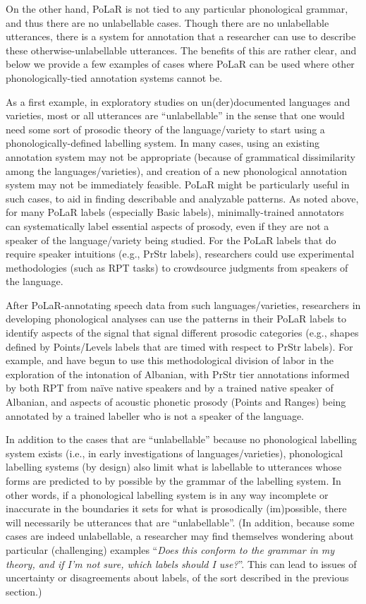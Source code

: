 \documentclass[11pt, twoside]{memoir}
\begin{document}
On the other hand, PoLaR is not tied to any particular phonological grammar, and thus there are no unlabellable cases. Though there are no unlabellable utterances, there is a system for annotation that a researcher can use to describe these otherwise-unlabellable utterances. The benefits of this are rather clear, and below we provide a few examples of cases where PoLaR can be used where other phonologically-tied annotation systems cannot be.

As a first example, in exploratory studies on un(der)documented languages and varieties, most or all utterances are “unlabellable” in the sense that one would need some sort of prosodic theory of the language\slash variety to start using a phonologically-defined labelling system. In many cases, using an existing annotation system may not be appropriate (because of grammatical dissimilarity among the languages\slash varieties), and creation of a new phonological annotation system may not be immediately feasible. PoLaR might be particularly useful in such cases, to aid in finding describable and analyzable patterns. As noted above, for many PoLaR labels (especially Basic labels), minimally-trained annotators can systematically label essential aspects of prosody, even if they are not a speaker of the language\slash variety being studied. For the PoLaR labels that do require speaker intuitions (e.g., PrStr labels), researchers could use experimental methodologies (such as RPT tasks) to crowdsource judgments from speakers of the language.

After PoLaR-annotating speech data from such languages\slash varieties, researchers in developing phonological analyses can use the patterns in their PoLaR labels to identify aspects of the signal that signal different prosodic categories (e.g., shapes defined by Points\slash Levels labels that are timed with respect to PrStr labels). For example, \citet{kapia-19} and \citet{brugos-21} have begun to use this methodological division of labor in the exploration of the intonation of Albanian, with PrStr tier annotations informed by both RPT from naïve native speakers and by a trained native speaker of Albanian, and aspects of acoustic phonetic prosody (Points and Ranges) being annotated by a trained labeller who is not a speaker of the language.

In addition to the cases that are “unlabellable” because no phonological labelling system exists (i.e., in early investigations of languages\slash varieties), phonological labelling systems (by design) also limit what is labellable to utterances whose forms are predicted to by possible by the grammar of the labelling system. In other words, if a phonological labelling system is in any way incomplete or inaccurate in the boundaries it sets for what is prosodically (im)possible, there will necessarily be utterances that are “unlabellable”. (In addition, because some cases are indeed unlabellable, a researcher may find themselves wondering about particular (challenging) examples “\textit{Does this conform to the grammar in my theory, and if I’m not sure, which labels should I use?}”. This can lead to issues of uncertainty or disagreements about labels, of the sort described in the previous section.)
\end{document}

